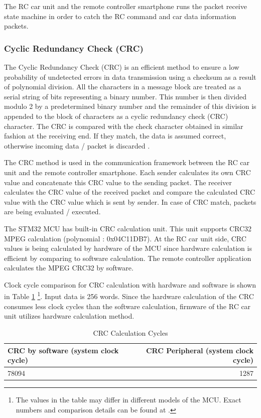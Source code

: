 The RC car unit and the remote controller smartphone runs the packet receive state machine in order to catch the RC command and car data information packets.

\subsubsection{Cyclic Redundancy Check (CRC)}

The  Cyclic  Redundancy  Check  (CRC)  is  an  efficient  method  to  ensure  a  low  probability of undetected errors in data transmission using a checksum as a result of polynomial  division. All the characters in a message block are treated as a serial string of bits representing a binary number. This number is then divided modulo 2 by a predetermined binary number and the remainder of this division is appended to the block of characters as a cyclic redundancy check (CRC)
character. The CRC is compared with the check character obtained in similar fashion at the receiving end. If they match, the data is assumed correct, otherwise incoming data / packet is discarded \cite{crc_book} \cite{crc_article}. 

The CRC method is used in the communication framework between the RC car unit and the remote controller smartphone. Each sender calculates its own CRC value and concatenate this CRC value to the sending packet. The receiver calculates the CRC value of the received packet and compare the calculated CRC value with the CRC value which is sent by sender. In case of CRC match, packets are being evaluated / executed. 

The STM32 MCU has built-in CRC calculation unit. This unit supports CRC32 MPEG calculation (polynomial : 0x04C11DB7). At the RC car unit side, CRC values is being calculated by hardware of the MCU since hardware calculation is efficient by comparing to software calculation. The remote controller application calculates the MPEG CRC32 by software. 

Clock cycle comparison for CRC calculation with hardware and software is shown in Table \ref{tab:crc_calc_compare} \footnote{The values in the table may differ in different models of the MCU. Exact numbers and comparison details can be found at \cite{Ref_stm32_um}.}. Input data is 256 words. Since the hardware calculation of the CRC consumes less clock cycles than the software calculation, firmware of the RC car unit utilizes hardware calculation method. \\

\begin{table}[!htbp]
    \centering
    \caption{\label{tab:crc_calc_compare}CRC Calculation Cycles}
    \begin{tabular}{l|r}
        CRC by software (system clock cycle) & CRC Peripheral (system clock cycle) \\\hline
        78094 & 1287 \\
    \end{tabular}
\end{table}


